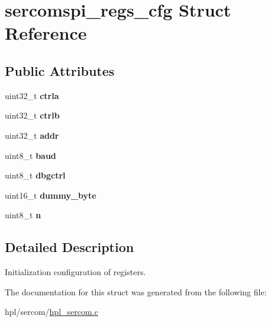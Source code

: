 \hypertarget{structsercomspi__regs__cfg}{}\section{sercomspi\+\_\+regs\+\_\+cfg Struct Reference}
\label{structsercomspi__regs__cfg}
\subsection*{Public Attributes}
\begin{DoxyCompactItemize}
\item 
\mbox{\label{structsercomspi__regs__cfg_afecc6ffc1a31b80a9c175ed923ae3afc}} 
uint32\+\_\+t {\bfseries ctrla}
\item 
\mbox{\label{structsercomspi__regs__cfg_a6eeb2dc36943666964c63451c132149a}} 
uint32\+\_\+t {\bfseries ctrlb}
\item 
\mbox{\label{structsercomspi__regs__cfg_aef2a6dc5d4526d150c8e6ee6dc9e1b86}} 
uint32\+\_\+t {\bfseries addr}
\item 
\mbox{\label{structsercomspi__regs__cfg_ab28d31d416080e0a060c14ef243e9103}} 
uint8\+\_\+t {\bfseries baud}
\item 
\mbox{\label{structsercomspi__regs__cfg_a852d086317885982fc2fa1d3a0556885}} 
uint8\+\_\+t {\bfseries dbgctrl}
\item 
\mbox{\label{structsercomspi__regs__cfg_aafef829c42193e3ea12b503e8fb44bfc}} 
uint16\+\_\+t {\bfseries dummy\+\_\+byte}
\item 
\mbox{\label{structsercomspi__regs__cfg_a6eb3f171a88e5e18290a62cb56b2835c}} 
uint8\+\_\+t {\bfseries n}
\end{DoxyCompactItemize}


\subsection{Detailed Description}
Initialization configuration of registers. 

The documentation for this struct was generated from the following file\+:\begin{DoxyCompactItemize}
\item 
hpl/sercom/\hyperlink{hpl__sercom_8c}{hpl\+\_\+sercom.\+c}\end{DoxyCompactItemize}
